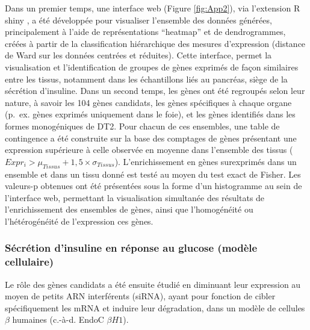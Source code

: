 \documentclass[11pt,a4paper,notrimn]{krantz}
\theoremstyle{definition}
\theoremstyle{definition}
\theoremstyle{remark}
\begin{document}
Dans un premier temps, une interface web (Figure \ref{fig:App2}), via
l'extension R shiny \citep{R-shiny}, a été développée pour visualiser
l'ensemble des données générées, principalement à l'aide de
représentations ``heatmap'' et de dendrogrammes, créées à partir de la
classification hiérarchique des mesures d'expression (distance de Ward
sur les données centrées et réduites). Cette interface, permet la
visualisation et l'identification de groupes de gènes exprimés de façon
similaires entre les tissus, notamment dans les échantillons liés au
pancréas, siège de la sécrétion d'insuline. Dans un second temps, les
gènes ont été regroupés selon leur nature, à savoir les 104 gènes
candidats, les gènes spécifiques à chaque organe (p.~ex. gènes exprimés
uniquement dans le foie), et les gènes identifiés dans les formes
monogéniques de DT2. Pour chacun de ces ensembles, une table de
contingence a été construite sur la base des comptages de gènes
présentant une expression supérieure à celle observée en moyenne dans
l'ensemble des tissus
(\(Expr_{i}>\mu_{Tissus}+1,5\times\sigma_{Tissus}\)). L'enrichissement
en gènes surexprimés dans un ensemble et dans un tissu donné est testé
au moyen du test exact de Fisher. Les valeurs-p obtenues ont été
présentées sous la forme d'un histogramme au sein de l'interface web,
permettant la visualisation simultanée des résultats de l'enrichissement
des ensembles de gènes, ainsi que l'homogénéité ou l'hétérogénéité de
l'expression ces gènes.

\subsubsection{Sécrétion d'insuline en réponse au glucose (modèle
cellulaire)}\label{secretion-dinsuline-en-reponse-au-glucose-modele-cellulaire}

Le rôle des gènes candidats a été ensuite étudié en diminuant leur
expression au moyen de petits ARN interférents (siRNA), ayant pour
fonction de cibler spécifiquement les mRNA et induire leur dégradation,
dans un modèle de cellules \(\beta\) humaines (c.-à-d. EndoC
\(\beta H1\)).
\end{document}
